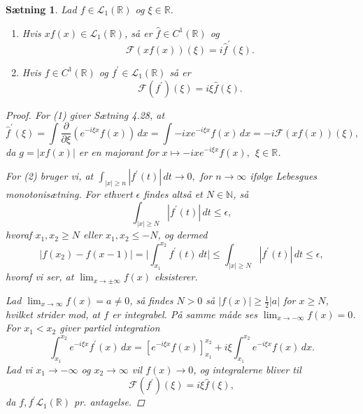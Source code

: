 \documentclass[12pt]{report}
\newtheorem{theorem}[lemma]{Sætning}
\theoremstyle{break}
\newtheorem*{proof}{Bevis}
\theoremstyle{break}
\newcommand{\RR}{\mathbb{R}}
\newcommand{\FI}{\mathcal{F}}
\renewcommand{\L}{\mathcal{L}}
\newcommand{\1}{\mathds{1}}
\begin{document}
\begin{theorem}
Lad $f\in\L_1(\RR)$ og $\xi\in\RR$.
\begin{enumerate}
\item Hvis $xf(x)\in\L_1(\RR)$, så er $\hat{f}\in C^1(\RR)$ og \[\FI(xf(x))(\xi)=i\hat{f}^\prime(\xi).\]
\item Hvis $f\in C^1(\RR)$ og $f^\prime\in\L_1(\RR)$ så er \[\FI(f^\prime)(\xi)=i\xi\hat{f}(\xi).\]
\end{enumerate}
\begin{proof}
For (1) giver Sætning 4.28, at \[\hat{f}^\prime(\xi)=\int\frac{\partial}{\partial\xi}\left(e^{-i\xi x}f(x)\right)\,dx=\int -ixe^{-i\xi x}f(x)\,dx=-i\FI(xf(x))(\xi),\]
da $g=|xf(x)|$ er en majorant for $x\mapsto-ixe^{-i\xi x}f(x),~~\xi\in\RR$.

\bigskip

For (2) bruger vi, at $\int_{|x|\geq n}|f^\prime(t)|\, dt\to 0,$ for $n\to\infty$ ifølge Lebesgues monotonisætning. For ethvert $\epsilon$ findes altså et $N\in\mathbb{N}$, så
\[\int_{|x|\geq N}|f^\prime(t)|\, dt\leq\epsilon,\]
hvoraf $x_1,x_2\geq N$ eller $x_1,x_2\leq-N$, og dermed
\[|f(x_2)-f(x-1)|=\lvert\int_{x_1}^{x_2}f^\prime(t)\,dt\rvert\leq\int_{|x|\geq N}|f^\prime(t)|\, dt\leq\epsilon,\]
hvoraf vi ser, at $\lim_{x\to\pm\infty}f(x)$ eksisterer.

\bigskip

Lad $\lim_{x\to\infty}f(x)=a\neq 0$, så findes $N>0$ så $|f(x)|\geq\frac{1}{2}|a|$ for $x\geq N$, hvilket strider mod, at $f$ er integrabel. På samme måde ses $\lim_{x\to-\infty}f(x)=0$. For $x_1<x_2$ giver partiel integration
\[\int_{x_1}^{x_2}e^{-i\xi x}f^\prime(x)\,dx=[e^{-i\xi x}f(x)]_{x_1}^{x_2}+i\xi\int_{x_1}^{x_2}e^{-i\xi x}f(x)\,dx.\]
Lad vi $x_1\to-\infty$ og $x_2\to\infty$ vil $f(x)\to 0$, og integralerne bliver til
\[\FI(f^\prime)(\xi)=i\xi\hat{f}(\xi),\]
da $f,f^\prime\L_1(\RR)$ pr. antagelse.
\end{proof}
\end{theorem}

\newpage
\end{document}

